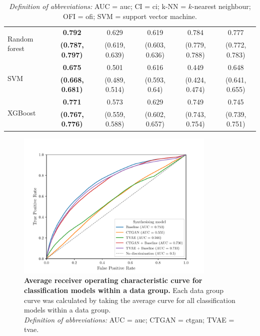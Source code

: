 \documentclass[12pt, a4paper]{article}
\begin{document}
\begin{table}
{\begin{tabular}{lccccc}
			\multirow{2}{*}{Random forest}       & \textbf{0.792}          & 0.629          & 0.619          & 0.784                     & 0.777                    \\
			                                     & \textbf{(0.787, 0.797)} & (0.619, 0.639) & (0.603, 0.636) & (0.779, 0.788)            & (0.772, 0.783)           \\[0.5em]
			\multirow{2}{*}{SVM}                 & \textbf{0.675}          & 0.501          & 0.616          & 0.449                     & 0.648                    \\
			                                     & \textbf{(0.668, 0.681)} & (0.489, 0.514) & (0.593, 0.64)  & (0.424, 0.474)            & (0.641, 0.655)           \\[0.5em]
			\multirow{2}{*}{XGBoost}             & \textbf{0.771}          & 0.573          & 0.629          & 0.749                     & 0.745                    \\
			                                     & \textbf{(0.767, 0.776)} & (0.559, 0.588) & (0.602, 0.657) & (0.743, 0.754)            & (0.739, 0.751)           \\
			\bottomrule
		\end{tabular}

	}
	\caption*{\small \textit{Definition of abbreviations:}
		AUC = \acrlong{auc}; CI = \acrlong{ci}; k-NN = $k$-nearest neighbour; OFI = \acrlong{ofi};
		SVM = support vector machine.}
\end{table}

\begin{figure}
	\centering
	\includegraphics[width=0.85\textwidth]{figures/roc.pdf}
	\caption{\textbf{Average receiver operating characteristic curve for classification models within a data group.}
		Each data group curve was calculated by taking the average curve for all classification models within a
		data group. \\
		\textit{Definition of abbreviations:} AUC = \Acrlong{auc}; CTGAN = \Acrlong{ctgan}; TVAE = \Acrlong{tvae}.}%
	\label{fig:roc}
\end{figure}
\end{document}

